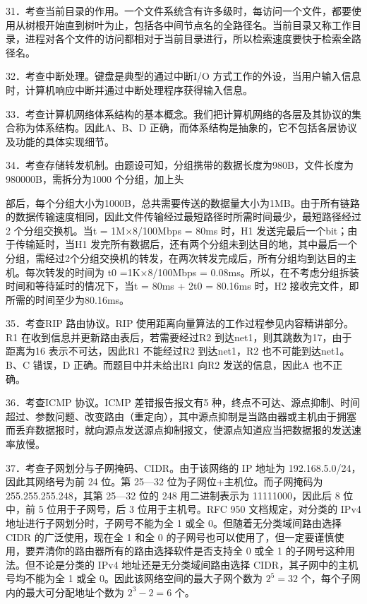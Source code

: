 \documentclass[UTF8,11pt]{ctexart}
\begin{document}
31．考查当前目录的作用。一个文件系统含有许多级时，每访问一个文件，都要使用从树根开始直到树叶为止，包括各中间节点名的全路径名。当前目录又称工作目录，进程对各个文件的访问都相对于当前目录进行，所以检索速度要快于检索全路径名。


32．考查中断处理。键盘是典型的通过中断I/O 方式工作的外设，当用户输入信息时，计算机响应中断并通过中断处理程序获得输入信息。


33．考查计算机网络体系结构的基本概念。我们把计算机网络的各层及其协议的集合称为体系结构。因此A、B、D 正确，而体系结构是抽象的，它不包括各层协议及功能的具体实现细节。


34．考查存储转发机制。由题设可知，分组携带的数据长度为980B，文件长度为980000B，需拆分为1000 个分组，加上头


部后，每个分组大小为1000B，总共需要传送的数据量大小为1MB。由于所有链路的数据传输速度相同，因此文件传输经过最短路径时所需时间最少，最短路径经过2 个分组交换机。当t = 1M×8/100Mbps = 80ms 时，H1 发送完最后一个bit；由于传输延时，当H1 发完所有数据后，还有两个分组未到达目的地，其中最后一个分组，需经过2个分组交换机的转发，在两次转发完成后，所有分组均到达目的主机。每次转发的时间为 t0 =1K×8/100Mbps = 0.08ms。所以，在不考虑分组拆装时间和等待延时的情况下，当t = 80ms + 2t0 = 80.16ms 时，H2 接收完文件，即所需的时间至少为80.16ms。


35．考查RIP 路由协议。RIP 使用距离向量算法的工作过程参见内容精讲部分。R1 在收到信息并更新路由表后，若需要经过R2 到达net1，则其跳数为17，由于距离为16 表示不可达，因此R1 不能经过R2 到达net1，R2 也不可能到达net1。B、C 错误，D 正确。而题目中并未给出R1 向R2 发送的信息，因此A 也不正确。


36．考查ICMP 协议。ICMP 差错报告报文有5 种，终点不可达、源点抑制、时间超过、参数问题、改变路由（重定向），其中源点抑制是当路由器或主机由于拥塞而丢弃数据报时，就向源点发送源点抑制报文，使源点知道应当把数据报的发送速率放慢。


37．考查子网划分与子网掩码、CIDR。由于该网络的 IP 地址为 192.168.5.0/24，因此其网络号为前 24 位。第 25—32 位为子网位+主机位。而子网掩码为 255.255.255.248，其第 25—32 位的 248 用二进制表示为 11111000，因此后 8 位中，前 5 位用于子网号，后 3 位用于主机号。RFC 950 文档规定，对分类的 IPv4 地址进行子网划分时，子网号不能为全 1 或全 0。但随着无分类域间路由选择 CIDR 的广泛使用，现在全 1 和全 0 的子网号也可以使用了，但一定要谨慎使用，要弄清你的路由器所有的路由选择软件是否支持全 0 或全 1 的子网号这种用法。但不论是分类的 IPv4 地址还是无分类域间路由选择 CIDR，其子网中的主机号均不能为全 1 或全 0。因此该网络空间的最大子网个数为 \(\displaystyle 2^5=32\) 个，每个子网内的最大可分配地址个数为 \(\displaystyle 2^3-2=6\) 个。
\end{document}
